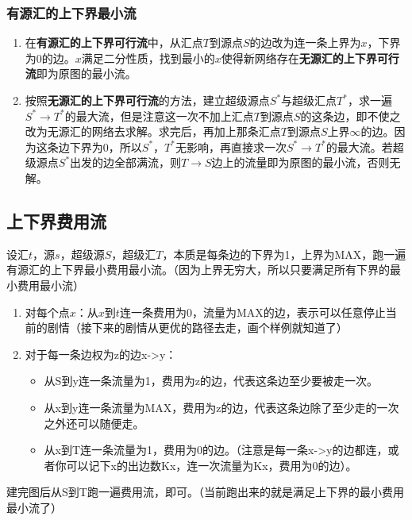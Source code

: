 \documentclass[a4paper]{ctexart}
\begin{document}
\subsubsection*{有源汇的上下界最小流}
\begin{enumerate}
	\item 在\textbf{有源汇的上下界可行流}中，从汇点$T$到源点$S$的边改为连一条上界为$x$，下界为$0$的边。$x$满足二分性质，找到最小的$x$使得新网络存在\textbf{无源汇的上下界可行流}即为原图的最小流。
	\item 按照\textbf{无源汇的上下界可行流}的方法，建立超级源点$S^*$与超级汇点$T^*$，求一遍$S^* \rightarrow T^*$的最大流，但是注意这一次不加上汇点$T$到源点$S$的这条边，即不使之改为无源汇的网络去求解。求完后，再加上那条汇点$T$到源点$S$上界$\infty$的边。因为这条边下界为$0$，所以$S^*$，$T^*$无影响，再直接求一次$S^* \rightarrow T^*$的最大流。若超级源点$S^*$出发的边全部满流，则$T \rightarrow S$边上的流量即为原图的最小流，否则无解。
\end{enumerate}

\subsection{上下界费用流}
\noindent 设汇$t$，源$s$，超级源$S$，超级汇$T$，本质是每条边的下界为1，上界为MAX，跑一遍有源汇的上下界最小费用最小流。（因为上界无穷大，所以只要满足所有下界的最小费用最小流）

\begin{enumerate}
	\item 对每个点$x$：从$x$到$t$连一条费用为0，流量为MAX的边，表示可以任意停止当前的剧情（接下来的剧情从更优的路径去走，画个样例就知道了）
	\item 对于每一条边权为z的边x->y：

	\begin{itemize}
		\item 从S到y连一条流量为1，费用为z的边，代表这条边至少要被走一次。
		\item 从x到y连一条流量为MAX，费用为z的边，代表这条边除了至少走的一次之外还可以随便走。
		\item 从x到T连一条流量为1，费用为0的边。（注意是每一条x->y的边都连，或者你可以记下x的出边数Kx，连一次流量为Kx，费用为0的边）。

	\end{itemize}
\end{enumerate}
建完图后从S到T跑一遍费用流，即可。（当前跑出来的就是满足上下界的最小费用最小流了）
\end{document}
